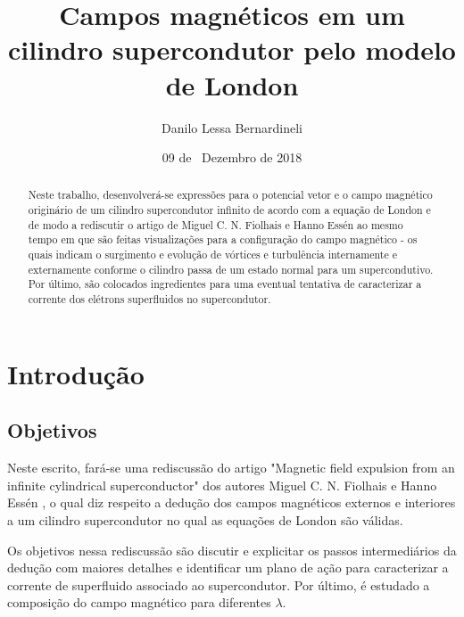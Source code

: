 \documentclass[%
 reprint,
 amsmath,amssymb,
 aps,
]{revtex4-1}
\begin{document}

\title{Campos magnéticos em um cilindro supercondutor pelo modelo de London}%

\author{Danilo Lessa Bernardineli}
%

\date{09 de ~Dezembro de 2018}
\begin{abstract}


Neste trabalho, desenvolverá-se expressões para o potencial vetor e o campo magnético originário de um cilindro supercondutor infinito de acordo com a equação de London e de modo a rediscutir o artigo de Miguel C. N. Fiolhais e Hanno Essén ao mesmo tempo em que são feitas visualizações para a configuração do campo magnético - os quais indicam o surgimento e evolução de vórtices e turbulência internamente e externamente conforme o cilindro passa de um estado normal para um supercondutivo. Por último, são colocados ingredientes para uma eventual tentativa de caracterizar a corrente dos elétrons superfluidos no supercondutor.

\end{abstract}

\maketitle

\section{Introdução}

\subsection{Objetivos}


Neste escrito, fará-se uma rediscussão do artigo "Magnetic field expulsion from an infinite cylindrical superconductor" dos autores Miguel C. N. Fiolhais e Hanno Essén \cite{original_article}, o qual diz respeito a dedução dos campos magnéticos externos e interiores a um cilindro supercondutor no qual as equações de London são válidas.

Os objetivos nessa rediscussão são discutir e explicitar os passos intermediários da dedução com maiores detalhes e identificar um plano de ação para caracterizar a corrente de superfluido associado ao supercondutor. Por último, é estudado a composição do campo magnético para diferentes $\lambda$.
\end{document}

